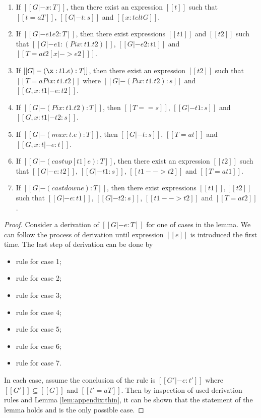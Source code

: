 \begin{lem}\label{lem:appendix:gen}
$\quad$
\begin{enumerate}[(1)]
	\item If $[[G |- x:T]]$, then there exist an expression $[[t]]$ such that $[[t =a T]]$, $[[G |- t:s]]$ and $[[x:t elt G]]$.
	\item If $[[G |- e1 e2:T]]$, then there exist expressions $[[t1]]$ and $[[t2]]$ such that $[[G |- e1 : (Pi x:t1.t2)]]$, $[[G |- e2:t1]]$ and $[[T =a t2[x |-> e2] ]]$.
	\item If $[[G |- (\x:t1.e):T]]$, then there exist an expression $[[t2]]$ such that $[[T =a Pi x:t1.t2]]$ where $[[G |- (Pi x:t1.t2):s]]$ and $[[G,x:t1 |- e:t2]]$.
    \item If $[[G |- (Pi x:t1.t2):T]]$, then $[[T == s]]$, $[[G |- t1:s]]$ and $[[G, x:t1 |- t2:s]]$.
	\item If $[[G |- (mu x:t.e):T]]$, then $[[G |- t:s]]$, $[[T =a t]]$ and $[[G, x:t|-e:t]]$.
	\item If $[[G |- (castup [t1] e):T]]$, then there exist an expression $[[t2]]$ such that $[[G |- e:t2]]$, $[[G |- t1:s]]$, $[[t1 --> t2]]$ and $[[T =a t1]]$.
	\item If $[[G |- (castdown e):T]]$, then there exist expressions $[[t1]],[[t2]]$ such that $[[G |- e:t1]]$, $[[G |- t2:s]]$, $[[t1 --> t2]]$ and $[[T =a t2]]$.
\end{enumerate}
\end{lem}

\begin{proof}
    Consider a derivation of $[[G |- e:T]]$ for one of cases in the lemma. We can follow the process of derivation until expression $[[e]]$ is introduced the first time. The last step of derivation can be done by
    \begin{itemize}
        \item rule  for case 1;
        \item rule  for case 2;
        \item rule  for case 3;
        \item rule  for case 4;
        \item rule  for case 5;
        \item rule  for case 6;
        \item rule  for case 7.
    \end{itemize}
    In each case, assume the conclusion of the rule is $[[G' |- e : t']]$ where $[[G']] \subseteq [[G]]$ and $[[t' =a T]]$. Then by inspection of used derivation rules and Lemma \ref{lem:appendix:thin}, it can be shown that the statement of the lemma holds and is the only possible case.
\end{proof}

